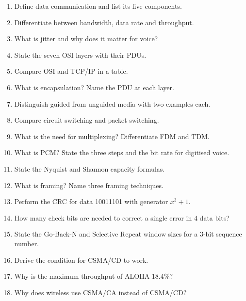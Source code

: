 \documentclass[11pt,a4paper]{article}
\begin{document}
\begin{enumerate}
\item Define data communication and list its five components.
\item Differentiate between bandwidth, data rate and throughput.
\item What is jitter and why does it matter for voice?
\item State the seven OSI layers with their PDUs.
\item Compare OSI and TCP/IP in a table.
\item What is encapsulation? Name the PDU at each layer.
\item Distinguish guided from unguided media with two examples each.
\item Compare circuit switching and packet switching.
\item What is the need for multiplexing? Differentiate FDM and TDM.
\item What is PCM? State the three steps and the bit rate for digitised voice.
\item State the Nyquist and Shannon capacity formulas.
\item What is framing? Name three framing techniques.
\item Perform the CRC for data 10011101 with generator $x^3+1$.
\item How many check bits are needed to correct a single error in 4 data bits?
\item State the Go-Back-N and Selective Repeat window sizes for a 3-bit sequence number.
\item Derive the condition for CSMA/CD to work.
\item Why is the maximum throughput of ALOHA 18.4\%?
\item Why does wireless use CSMA/CA instead of CSMA/CD?
\end{enumerate}
\end{document}
